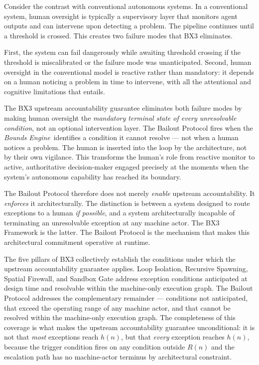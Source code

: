 \documentclass[12pt]{article}
\newcommand{\bounds}{\textit{Bounds Engine}}
\begin{document}
Consider the contrast with conventional autonomous systems. In a conventional system, human oversight is typically a supervisory layer that monitors agent outputs and can intervene upon detecting a problem. The pipeline continues until a threshold is crossed. This creates two failure modes that BX3 eliminates.

First, the system can fail dangerously while awaiting threshold crossing if the threshold is miscalibrated or the failure mode was unanticipated. Second, human oversight in the conventional model is reactive rather than mandatory: it depends on a human noticing a problem in time to intervene, with all the attentional and cognitive limitations that entails.

The BX3 upstream accountability guarantee eliminates both failure modes by making human oversight the \textit{mandatory terminal state of every unresolvable condition}, not an optional intervention layer. The Bailout Protocol fires when the \bounds\ identifies a condition it cannot resolve --- not when a human notices a problem. The human is inserted into the loop by the architecture, not by their own vigilance. This transforms the human's role from reactive monitor to active, authoritative decision-maker engaged precisely at the moments when the system's autonomous capability has reached its boundary.

The Bailout Protocol therefore does not merely \textit{enable} upstream accountability. It \textit{enforces} it architecturally. The distinction is between a system designed to route exceptions to a human \textit{if possible}, and a system architecturally incapable of terminating an unresolvable exception at any machine actor. The BX3 Framework is the latter. The Bailout Protocol is the mechanism that makes this architectural commitment operative at runtime.

The five pillars of BX3 collectively establish the conditions under which the upstream accountability guarantee applies. Loop Isolation, Recursive Spawning, Spatial Firewall, and Sandbox Gate address exception conditions anticipated at design time and resolvable within the machine-only execution graph. The Bailout Protocol addresses the complementary remainder --- conditions not anticipated, that exceed the operating range of any machine actor, and that cannot be resolved within the machine-only execution graph. The completeness of this coverage is what makes the upstream accountability guarantee unconditional: it is not that \emph{most} exceptions reach $h(n)$, but that \emph{every} exception reaches $h(n)$, because the trigger condition fires on any condition outside $R(n)$ and the escalation path has no machine-actor terminus by architectural constraint.
\end{document}

